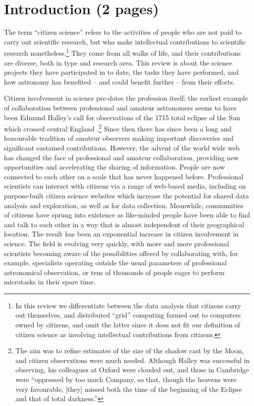 \documentclass{ar2e}
\begin{document}

\section{Introduction (2 pages)}
\label{sec:intro}

The term ``citizen science'' refers to the activities of people who are not paid
to carry out scientific research, but who make intellectual contributions to
scientific research nonetheless.\footnote{In this review we differentiate
between the data analysis that citizens carry out themselves, and  distributed
``grid'' computing farmed out to computers owned by citizens, and omit the
latter since it does not fit our definition of citizen science as involving
intellectual  contributions from citizens.} They come from all walks of life,
and their contributions are diverse, both in type and research area. This review
is about the science projects they have participated in to date, the tasks they
have performed, and how astronomy has benefited -- and could benefit further --
from their efforts.

Citizen involvement in science pre-dates the profession itself; the earliest
example of collaboration between professional and amateur astronomers seems to
have been Edmund Halley's call for observations of the 1715 total eclipse of the
Sun which crossed central England \citep{Halley}.\footnote{The aim was to refine
estimates of the size of the shadow cast by the Moon, and citizen observations
were much needed. Although Halley was successful in observing, his colleagues at
Oxford were clouded out, and those in Cambridge were ``oppressed by too much
Company, so that, though the heavens were very favourable, [they] missed both
the time of the beginning of the Eclipse and that of total darkness.''}  Since
then there has since been a long and honourable tradition of amateur observers
making important discoveries and significant sustained contributions. However,
the advent of the world wide web has changed the face of professional and
amateur collaboration, providing new opportunities and accelerating the sharing
of information. People are now connected to each other on a scale that has never
happened before. Professional scientists can interact with citizens via a range
of web-based media, including on purpose-built citizen science websites which
increase the potential for shared data analysis and exploration, as well as for
data collection. Meanwhile, communities of citizens have sprung into existence
as like-minded people have been able to find and talk to each other in a way
that is almost independent of their geographical location. The result has been
an exponential increase in citizen involvement in science. The field is evolving
very quickly, with more and more professional scientists becoming aware of the
possibilities offered by collaborating with, for example, specialists operating
outside the usual parameters of professional astronomical observation, or tens
of thousands of people eager to perform microtasks in their spare time.  
\end{document}

